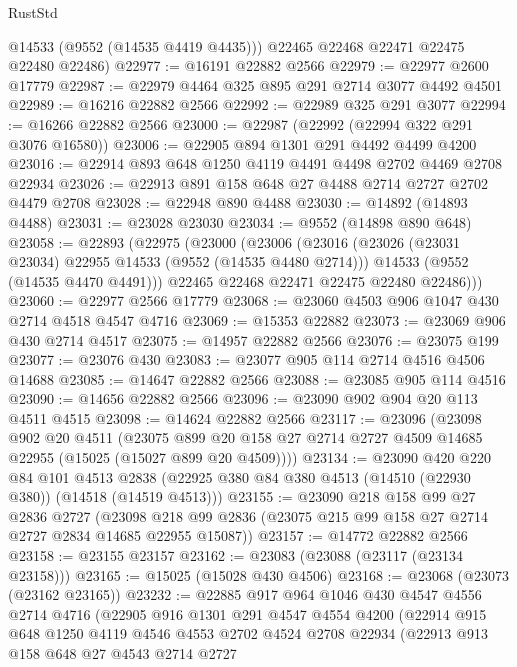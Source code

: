 \begin{lexlean}{RustStd}
\begin{coremodule}
        @14533
        (@9552 (@14535 @4419 @4435)))
      @22465
      @22468
      @22471
      @22475
      @22480
      @22486)
@22977 := @16191 @22882 @2566
@22979 := @22977 @2600 @17779
@22987 := @22979 @4464 @325 @895 @291 @2714 @3077 @4492 @4501
@22989 := @16216 @22882 @2566
@22992 := @22989 @325 @291 @3077
@22994 := @16266 @22882 @2566
@23000 := @22987 (@22992 (@22994 @322 @291 @3076 @16580))
@23006 := @22905 @894 @1301 @291 @4492 @4499 @4200
@23016 := @22914 @893 @648 @1250 @4119 @4491 @4498 @2702 @4469 @2708 @22934
@23026 := @22913 @891 @158 @648 @27 @4488 @2714 @2727 @2702 @4479 @2708
@23028 := @22948 @890 @4488
@23030 := @14892 (@14893 @4488)
@23031 := @23028 @23030
@23034 := @9552 (@14898 @890 @648)
@23058 := @22893
    (@22975
      (@23000
        (@23006
          (@23016
            (@23026 (@23031 @23034) @22955 @14533 (@9552 (@14535 @4480 @2714)))
            @14533
            (@9552 (@14535 @4470 @4491)))
          @22465
          @22468
          @22471
          @22475
          @22480
          @22486)))
@23060 := @22977 @2566 @17779
@23068 := @23060 @4503 @906 @1047 @430 @2714 @4518 @4547 @4716
@23069 := @15353 @22882
@23073 := @23069 @906 @430 @2714 @4517
@23075 := @14957 @22882 @2566
@23076 := @23075 @199
@23077 := @23076 @430
@23083 := @23077 @905 @114 @2714 @4516 @4506 @14688
@23085 := @14647 @22882 @2566
@23088 := @23085 @905 @114 @4516
@23090 := @14656 @22882 @2566
@23096 := @23090 @902 @904 @20 @113 @4511 @4515
@23098 := @14624 @22882 @2566
@23117 := @23096
    (@23098
      @902
      @20
      @4511
      (@23075 @899 @20 @158 @27 @2714 @2727 @4509 @14685 @22955 (@15025 (@15027 @899 @20 @4509))))
@23134 := @23090
    @420
    @220
    @84
    @101
    @4513
    @2838
    (@22925 @380 @84 @380 @4513 (@14510 (@22930 @380)) (@14518 (@14519 @4513)))
@23155 := @23090
    @218
    @158
    @99
    @27
    @2836
    @2727
    (@23098 @218 @99 @2836 (@23075 @215 @99 @158 @27 @2714 @2727 @2834 @14685 @22955 @15087))
@23157 := @14772 @22882 @2566
@23158 := @23155 @23157
@23162 := @23083 (@23088 (@23117 (@23134 @23158)))
@23165 := @15025 (@15028 @430 @4506)
@23168 := @23068 (@23073 (@23162 @23165))
@23232 := @22885
    @917
    @964
    @1046
    @430
    @4547
    @4556
    @2714
    @4716
    (@22905
      @916
      @1301
      @291
      @4547
      @4554
      @4200
      (@22914
        @915
        @648
        @1250
        @4119
        @4546
        @4553
        @2702
        @4524
        @2708
        @22934
        (@22913
          @913
          @158
          @648
          @27
          @4543
          @2714
          @2727

\end{coremodule}
\end{lexlean}
